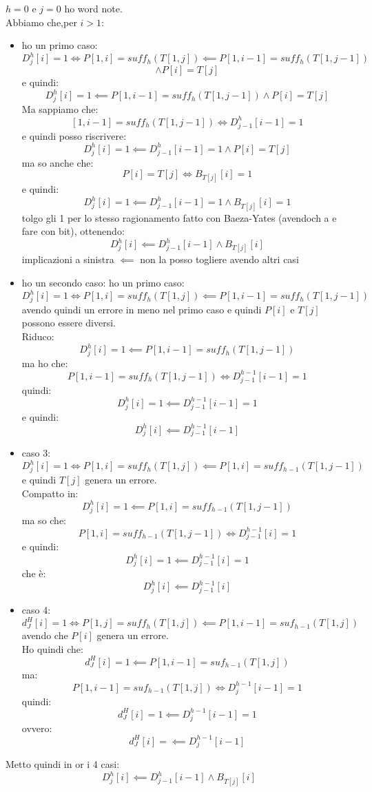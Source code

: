 \documentclass[a4paper,12pt, oneside]{book}
\begin{document}
$h=0$ e $j=0$ ho word note.\\
Abbiamo che,per $i>1$:
\begin{itemize}
  \item ho un primo caso:
  \[D_j^h[i]=1\iff P[1,i]=suff_h(T[1,j])\impliedby P[1,i-1] =
    suff_h(T[1,j-1])\]\[\land P[i] = T[j] \]
  e quindi:
  \[D_j^h[i]=1\impliedby P[1,i-1] = suff_h(T[1,j-1])\land P[i] = T[j] \]
  Ma sappiamo che:
  \[[1,i-1] = suff_h(T[1,j-1])\iff D_{j-1}^h[i-1]=1\]
  e quindi posso riscrivere:
  \[D_j^h[i]=1\impliedby D_{j-1}^h[i-1]=1\land P[i] = T[j] \]
  ma so anche che:
  \[P[i]=T[j]\iff B_{T[j]}[i] = 1\]
  e quindi:
  \[D_j^h[i]=1\impliedby D_{j-1}^h[i-1]=1\land B_{T[j]}[i] = 1\]
  tolgo gli 1 per lo stesso ragionamento fatto con Baeza-Yates (avendoch a e
  fare con bit), ottenendo:
  \[D_j^h[i]\impliedby D_{j-1}^h[i-1]\land B_{T[j]}[i]\]
  implicazioni a sinistra $\impliedby$ non la posso togliere avendo altri casi
  \item ho un secondo caso:
   ho un primo caso:
  \[D_j^h[i]=1\iff P[1,i]=suff_h(T[1,j])\impliedby P[1,i-1] =
    suff_h(T[1,j-1]) \]
  avendo quindi un errore in meno nel primo caso e quindi $P[i]$ e $T[j]$
  possono essere diversi.\\
  Riduco:
  \[D_j^h[i]=1\impliedby P[1,i-1] = suff_h(T[1,j-1]) \]
  ma ho che:
  \[P[1,i-1] = suff_h(T[1,j-1]) \iff D_{j-1}^{h-1}[i-1]=1\]
  quindi:
  \[D_j^h[i]=1\impliedby D_{j-1}^{h-1}[i-1]=1 \]
  e quindi:
  \[D_j^h[i]\impliedby D_{j-1}^{h-1}[i-1] \]
  \item caso 3:
  \[D^h_j[i] = 1 \iff P[1,i] = suff_h(T[1,j])\impliedby P[1,i] =
    suff_{h-1}(T[1,j-1])\]
  e quindi $T[j]$ genera un errore.\\
  Compatto in:
  \[D^h_j[i] = 1 \impliedby P[1,i] =    suff_{h-1}(T[1,j-1])\]
  ma so che:
  \[ P[1,i] = suff_{h-1}(T[1,j-1])\iff  D_{j-1}^{h-1}[i]=1\]
  e quindi:
  \[D^h_j[i] = 1 \impliedby D_{j-1}^{h-1}[i]=1\]
  che è:
  \[D^h_j[i]  \impliedby D_{j-1}^{h-1}[i]\]
  \item caso 4:
  \[d_J^H[i]=1\iff P[1,j]=suff_h(T[1,j])\impliedby P[1,i-1]=suf_{h-1}(T[1,j])\]
  avendo che $P[i]$ genera un errore.\\
  Ho quindi che:
  \[d_J^H[i]=1\impliedby P[1,i-1]=suf_{h-1}(T[1,j])\]
  ma:
  \[P[1,i-1]=suf_{h-1}(T[1,j])\iff D_j^{h-1}[i-1]=1\]
  quindi:
  \[d_J^H[i]=1\impliedby D_j^{h-1}[i-1]=1\]
  ovvero:
  \[d_J^H[i]=\impliedby D_j^{h-1}[i-1]\]

\end{itemize}
Metto quindi in or i 4 casi:
\[D_j^h[i]\impliedby D_{j-1}^h[i-1]\land B_{T[j]}[i]\]
\end{document}
